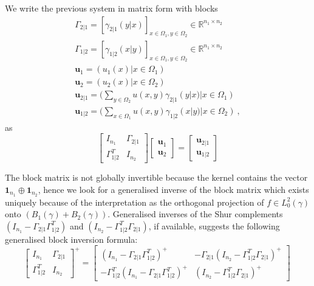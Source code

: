 \documentclass[runningheads]{llncs}
\newcommand{\reals}{\mathbb R}
\begin{document}
We write the previous system in matrix form with blocks
\begin{gather*}
  \Gamma_{2|1} = [\gamma_{2|1}(y|x)]_{x \in \Omega_1, y \in \Omega_2} \in \reals^{n_1 \times n_2} \\
  \Gamma_{1|2} = [\gamma_{1|2}(x|y)]_{x \in \Omega_1, y \in \Omega_2} \in \reals^{n_1 \times n_2} \\
  \bm u_1 = (u_1(x) | x \in \Omega_1) \\
  \bm u_2 = (u_2(x) | x \in \Omega_2) \\
  \bm u_{2|1} = (\sum_{y \in \Omega_2} u(x,y)\gamma_{2|1}(y|x) | x \in \Omega_1) \\
  \bm u_{1|2} = (\sum_{x\in\Omega_1} u(x,y)\gamma_{1|2}(x|y) | x \in \Omega_2) \ ,
\end{gather*}
as 
\begin{equation}
\label{eq:block}
  \begin{bmatrix}
    I_{n_1} & \Gamma_{2|1} \\ \Gamma_{1|2}^T & I_{n_2}
  \end{bmatrix}
  \begin{bmatrix}
    \bm u_1 \\ \bm u_2
  \end{bmatrix}
=
\begin{bmatrix}
  \bm u_{2|1} \\ \bm u_{1|2}
\end{bmatrix}
\end{equation}

The block matrix is not globally invertible because the kernel contains the vector $\bm 1 _{n_1} \oplus \bm 1_{n_2}$, hence we look for a generalised inverse of the block matrix  which  exists uniquely because of the interpretation as the orthogonal projection of $f \in L_0^2(\gamma)$ onto $(B_1(\gamma) + B_2(\gamma))$. Generalised inverses of the Shur complements $(I_{n_1}-\Gamma_{2|1}\Gamma_{1|2}^T)$ and $(I_{n_2}-\Gamma_{1|2}^T\Gamma_{2|1})$, if available, suggests the following generalised block inversion formula:
\begin{equation}
\label{eq:blocksolve}
\begin{bmatrix}
    I_{n_1} & \Gamma_{2|1} \\ \Gamma_{1|2}^T & I_{n_2}
  \end{bmatrix} ^+ =
  \begin{bmatrix}
    (I_{n_1}-\Gamma_{2|1}\Gamma_{1|2}^T)^{+} & - \Gamma_{2|1} (I_{n_2}-\Gamma_{1|2}^T\Gamma_{2|1})^{+} \\
 - \Gamma_{1|2}^T (I_{n_1}-\Gamma_{2|1}\Gamma_{1|2}^T)^{+} & (I_{n_2}-\Gamma_{1|2}^T\Gamma_{2|1})^{+} 
\end{bmatrix} \ 
\end{equation}
\end{document}
